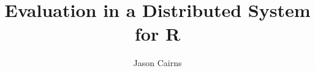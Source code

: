 \documentclass[10pt,a4paper]{article}
\begin{document}
    \title{Evaluation in a Distributed System for R}
    \author{Jason Cairns}
      
    \maketitle

\end{document}
